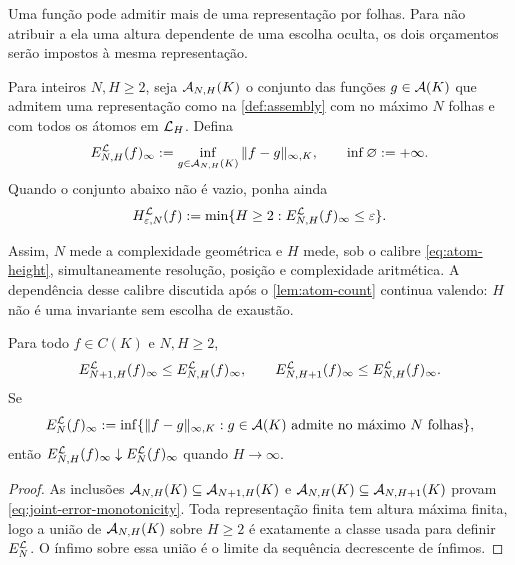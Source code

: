 Uma função pode admitir mais de uma representação por folhas. Para não
atribuir a ela uma altura dependente de uma escolha oculta, os dois
orçamentos serão impostos à mesma representação.

\begin{definition}
\label{def:joint-error}
Para inteiros $N,H\ge2$, seja $\mathcal{A}_{N,H}(K)$ o conjunto das funções
$g\in\mathcal{A}(K)$ que admitem uma representação como na
\cref{def:assembly} com no máximo $N$ folhas e com todos os átomos em
$\mathcal{L}_H$. Defina
\begin{equation}
 E_{N,H}^{\mathcal{L}}(f)_\infty
 :=\inf_{g\in\mathcal{A}_{N,H}(K)}\|f-g\|_{\infty,K},
 \qquad \inf\varnothing:=+\infty.
 \label{eq:joint-error}
\end{equation}
Quando o conjunto abaixo não é vazio, ponha ainda
\begin{equation}
 H_{\varepsilon,N}^{\mathcal{L}}(f)
 :=\min\{H\ge2:E_{N,H}^{\mathcal{L}}(f)_\infty\le\varepsilon\}.
 \label{eq:height-for-accuracy}
\end{equation}
\end{definition}

Assim, $N$ mede a complexidade geométrica e $H$ mede, sob o calibre
\eqref{eq:atom-height}, simultaneamente resolução, posição e complexidade
aritmética. A dependência desse calibre discutida após o
\cref{lem:atom-count} continua valendo: $H$ não é uma invariante sem escolha
de exaustão.

\begin{proposition}
\label{prop:joint-error-monotonicity}
Para todo $f\in C(K)$ e $N,H\ge2$,
\begin{equation}
 E_{N+1,H}^{\mathcal{L}}(f)_\infty\le E_{N,H}^{\mathcal{L}}(f)_\infty,
 \qquad
 E_{N,H+1}^{\mathcal{L}}(f)_\infty\le E_{N,H}^{\mathcal{L}}(f)_\infty.
 \label{eq:joint-error-monotonicity}
\end{equation}
Se
\[
 E_N^{\mathcal{L}}(f)_\infty
 :=\inf\{\|f-g\|_{\infty,K}:g\in\mathcal{A}(K)
       \text{ admite no máximo $N$ folhas}\},
\]
então $E_{N,H}^{\mathcal{L}}(f)_\infty\downarrow
E_N^{\mathcal{L}}(f)_\infty$ quando $H\to\infty$.
\end{proposition}

\begin{proof}
As inclusões
$\mathcal{A}_{N,H}(K)\subseteq\mathcal{A}_{N+1,H}(K)$ e
$\mathcal{A}_{N,H}(K)\subseteq\mathcal{A}_{N,H+1}(K)$ provam
\eqref{eq:joint-error-monotonicity}. Toda representação finita tem altura
máxima finita, logo a união de $\mathcal{A}_{N,H}(K)$ sobre $H\ge2$ é exatamente
a classe usada para definir $E_N^{\mathcal{L}}$. O ínfimo sobre essa união é o
limite da sequência decrescente de ínfimos.
\end{proof}

